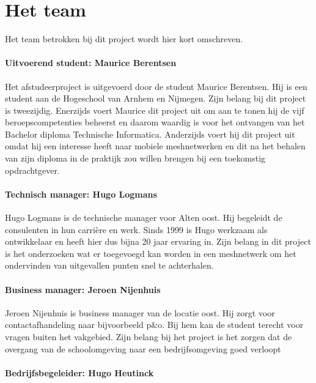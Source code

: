 \documentclass[a4paper, 11pt, oneside]{report}
\begin{document}
\section{Het team}\label{sec:het-team}
Het team betrokken bij dit project wordt hier kort omschreven.

\paragraph{Uitvoerend student: Maurice Berentsen}

Het afstudeerproject is uitgevoerd door de student Maurice Berentsen. 
Hij is een student aan de Hogeschool van Arnhem en Nijmegen. 
Zijn belang bij dit project is tweezijdig. 
Enerzijds voert Maurice dit project uit om aan te tonen hij de vijf beroepscompetenties beheerst en daarom waardig is voor het ontvangen van het Bachelor diploma Technische Informatica. 
Anderzijds voert hij dit project uit omdat hij een interesse heeft naar mobiele meshnetwerken en dit na het behalen van zijn diploma in de praktijk zou willen brengen bij een toekomstig opdrachtgever. 

\paragraph{Technisch manager: Hugo Logmans}

Hugo Logmans is de technische manager voor Alten oost. Hij begeleidt de consulenten in hun carrière en werk. Sinds 1999 is Hugo werkzaam als ontwikkelaar en heeft hier dus bijna 20 jaar ervaring in. Zijn belang in dit project is het onderzoeken wat er toegevoegd kan worden in een meshnetwerk om het ondervinden van uitgevallen punten snel te achterhalen.

\paragraph{Business manager: Jeroen Nijenhuis}
Jeroen Nijenhuis is business manager van de locatie oost. Hij zorgt voor contactafhandeling naar bijvoorbeeld p\&o. Bij hem kan de student terecht voor vragen buiten het vakgebied. Zijn belang bij het project is het zorgen dat de overgang van de schoolomgeving naar een bedrijfsomgeving goed verloopt 

\paragraph{Bedrijfsbegeleider: Hugo Heutinck}
\end{document}
